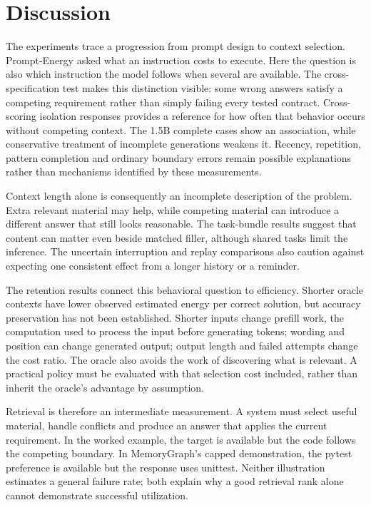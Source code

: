 \documentclass[10pt,a4paper,twocolumn]{article}
\begin{document}
\section{Discussion}
The experiments trace a progression from prompt design to context selection.
Prompt-Energy asked what an instruction costs to execute. Here the question is
also which instruction the model follows when several are available. The
cross-specification test makes this distinction visible: some wrong answers
satisfy a competing requirement rather than simply failing every tested
contract. Cross-scoring isolation responses provides a reference for how often
that behavior occurs without competing context. The 1.5B complete cases show an
association, while conservative treatment of incomplete generations weakens it.
Recency, repetition, pattern completion and ordinary boundary errors remain
possible explanations rather than mechanisms identified by these measurements.

Context length alone is consequently an incomplete description of the problem.
Extra relevant material may help, while competing material can introduce a
different answer that still looks reasonable. The task-bundle results suggest
that content can matter even beside matched filler, although shared tasks limit
the inference. The uncertain interruption and replay comparisons also caution
against expecting one consistent effect from a longer history or a reminder.

The retention results connect this behavioral question to efficiency. Shorter
oracle contexts have lower observed estimated energy per correct solution, but
accuracy preservation has not been established. Shorter inputs change prefill work, the computation used to process the input
before generating tokens; wording and position can change generated output; output length and failed
attempts change the cost ratio. The oracle also avoids the work of discovering
what is relevant. A practical policy must be evaluated with that selection cost
included, rather than inherit the oracle's advantage by assumption.

Retrieval is therefore an intermediate measurement. A system must select useful
material, handle conflicts and produce an answer that applies the current
requirement. In the worked example, the target is available but the code follows
the competing boundary. In MemoryGraph's capped demonstration, the pytest
preference is available but the response uses unittest. Neither illustration
estimates a general failure rate; both explain why a good retrieval rank alone
cannot demonstrate successful utilization.
\end{document}

